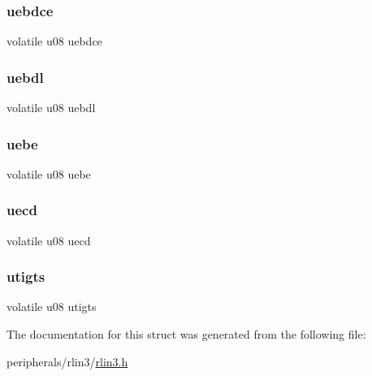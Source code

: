 \subsubsection{\texorpdfstring{uebdce}{uebdce}}
{\footnotesize\ttfamily volatile u08 uebdce}

\mbox{\label{structrlin3__luor1_a8253eb29949d08d22137f36f07c2afd9}} 
\subsubsection{\texorpdfstring{uebdl}{uebdl}}
{\footnotesize\ttfamily volatile u08 uebdl}

\mbox{\label{structrlin3__luor1_a5fbde11594cb93b55797977dc6cfa673}} 
\subsubsection{\texorpdfstring{uebe}{uebe}}
{\footnotesize\ttfamily volatile u08 uebe}

\mbox{\label{structrlin3__luor1_a5ad25a28d75171f517e116ac5426057c}} 
\subsubsection{\texorpdfstring{uecd}{uecd}}
{\footnotesize\ttfamily volatile u08 uecd}

\mbox{\label{structrlin3__luor1_a21be856b4afd08864a898101fff940f0}} 
\subsubsection{\texorpdfstring{utigts}{utigts}}
{\footnotesize\ttfamily volatile u08 utigts}



The documentation for this struct was generated from the following file\+:\begin{DoxyCompactItemize}
\item 
peripherals/rlin3/\mbox{\hyperlink{rlin3_8h}{rlin3.\+h}}\end{DoxyCompactItemize}
